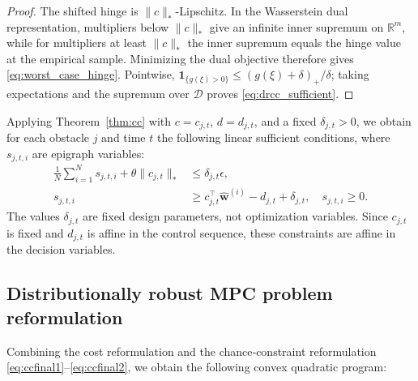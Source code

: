 \documentclass[pdflatex,sn-mathphys,Numbered]{sn-jnl}
\numberwithin{equation}{section}
\begin{document}
\begin{proof}
The shifted hinge is $\|c\|_*$-Lipschitz. In the Wasserstein dual representation, multipliers below $\|c\|_*$ give an infinite inner supremum on $\mathbb{R}^m$, while for multipliers at least $\|c\|_*$ the inner supremum equals the hinge value at the empirical sample. Minimizing the dual objective therefore gives \eqref{eq:worst_case_hinge}. Pointwise, $\mathbf{1}_{\{g(\xi)>0\}}\le (g(\xi)+\delta)_+/\delta$; taking expectations and the supremum over $\mathcal{D}$ proves \eqref{eq:drcc_sufficient}.
\end{proof}

Applying Theorem~\ref{thm:cc} with $c=c_{j,t}$, $d=d_{j,t}$, and a fixed $\delta_{j,t}>0$, we obtain for each obstacle $j$ and time $t$ the following linear sufficient conditions, where $s_{j,t,i}$ are epigraph variables:
\begin{align}
\frac{1}{N}\sum_{i=1}^{N} s_{j,t,i} + \theta\|c_{j,t}\|_* &\le \delta_{j,t}\epsilon, \label{eq:ccfinal1} \\
s_{j,t,i} &\ge c_{j,t}^\top \hat{\mathbf{w}}^{(i)} - d_{j,t} + \delta_{j,t}, \quad s_{j,t,i}\ge0. \label{eq:ccfinal2}
\end{align}
The values $\delta_{j,t}$ are fixed design parameters, not optimization variables. Since $c_{j,t}$ is fixed and $d_{j,t}$ is affine in the control sequence, these constraints are affine in the decision variables.

\subsection{Distributionally robust MPC problem reformulation}

Combining the cost reformulation and the chance‑constraint reformulation \eqref{eq:ccfinal1}–\eqref{eq:ccfinal2}, we obtain the following convex quadratic program:
\end{document}

